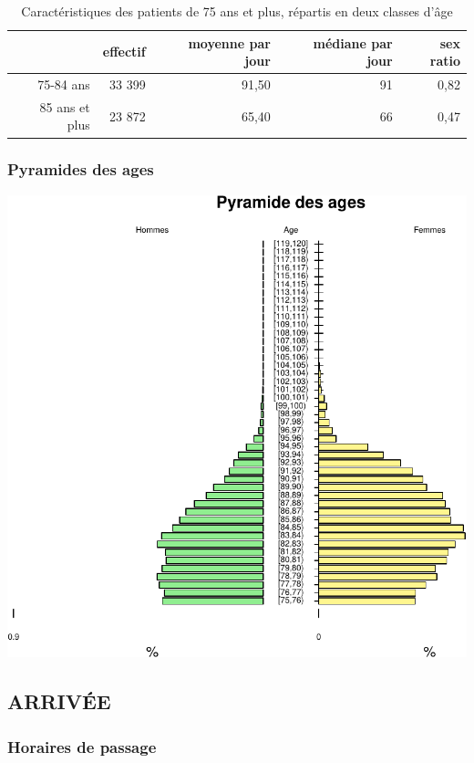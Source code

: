 \documentclass[]{article}
\begin{document}
\begin{table}[ht]
\centering
\begin{tabular}{rrrrr}
  \hline
 & effectif & moyenne par jour  & médiane par jour & sex ratio \\ 
  \hline
75-84 ans & 33 399 & 91,50 &  91 & 0,82 \\ 
  85 ans et plus & 23 872 & 65,40 &  66 & 0,47 \\ 
   \hline
\end{tabular}
\caption{Caractéristiques des patients de 75 ans et plus, répartis en deux classes d'âge} 
\end{table}

\subsubsection{Pyramides des ages}\label{pyramides-des-ages}

\includegraphics{rapport2014_V4_files/figure-latex/unnamed-chunk-13-1.pdf}

\subsection{ARRIVÉE}\label{arrivee-1}

\subsubsection{Horaires de passage}\label{horaires-de-passage-1}
\end{document}
